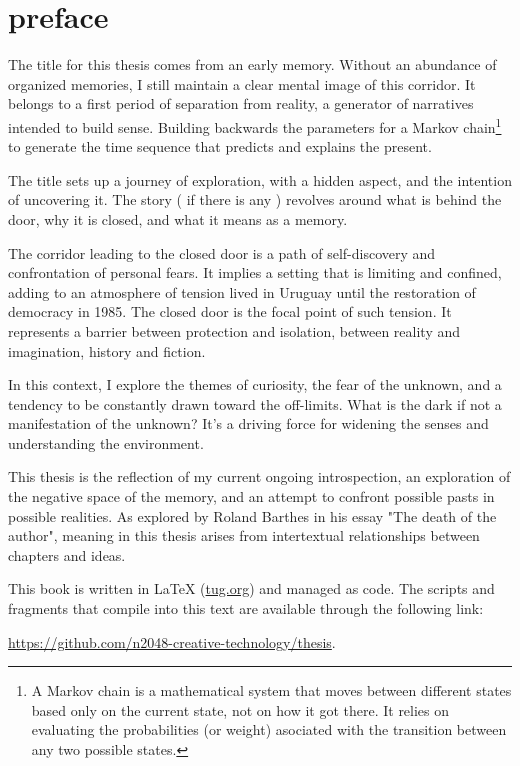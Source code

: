 \chapter*{preface}
\normalsize

\newpage  %
The title for this thesis comes from an early memory. Without an abundance of organized memories, I still maintain a clear mental image of this corridor. It belongs to a first period of separation from reality, a generator of narratives intended to build sense. Building backwards the parameters for a Markov chain\footnote{A Markov chain is a mathematical system that moves between different states based only on the current state, not on how it got there. It relies on evaluating the probabilities (or weight) asociated with the transition between any two possible states.} to generate the time sequence that predicts and explains the present.    

The title sets up a journey of exploration, with a hidden aspect, and the intention of uncovering it. The story ( if there is any ) {r}evolves around what is behind the door, why it is closed, and what it means as a memory.

The corridor leading to the closed door is a path of self-discovery and confrontation of personal fears. It implies a setting that is limiting and confined, adding to an atmosphere of tension lived in Uruguay until the restoration of democracy in 1985. The closed door is the focal point of such tension. It represents a barrier between protection and isolation, between reality and imagination, history and fiction.

In this context, I explore the themes of curiosity, the fear of the unknown, and a tendency to be constantly drawn toward the off-limits. What is the dark if not a manifestation of the unknown? It's a driving force for widening the senses and understanding the environment.

This thesis is the reflection of my current ongoing introspection, an exploration of the negative space of the memory, and an attempt to confront possible pasts in possible realities. As explored by Roland Barthes in his essay "The death of the author"\citep{barthes1967}, meaning in this thesis arises from intertextual relationships between chapters and ideas. 



This book is written in \LaTeX{} (\href{https://www.tug.org/texlive/quickinstall.html}{tug.org}) and managed as code. The scripts and fragments that compile into this text are available through the following link: 

\href{https://github.com/n2048-creative-technology/thesis}{https://github.com/n2048-creative-technology/thesis}.
